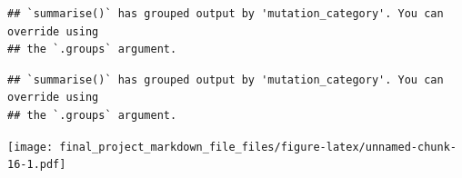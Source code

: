 \documentclass[
]{article}
\newenvironment{Shaded}{\begin{snugshade}}{\end{snugshade}}
\newcommand{\CommentTok}[1]{\textcolor[rgb]{0.56,0.35,0.01}{\textit{#1}}}
\newcommand{\DataTypeTok}[1]{\textcolor[rgb]{0.13,0.29,0.53}{#1}}
\newcommand{\DecValTok}[1]{\textcolor[rgb]{0.00,0.00,0.81}{#1}}
\newcommand{\FloatTok}[1]{\textcolor[rgb]{0.00,0.00,0.81}{#1}}
\newcommand{\KeywordTok}[1]{\textcolor[rgb]{0.13,0.29,0.53}{\textbf{#1}}}
\newcommand{\NormalTok}[1]{#1}
\newcommand{\OperatorTok}[1]{\textcolor[rgb]{0.81,0.36,0.00}{\textbf{#1}}}
\newcommand{\StringTok}[1]{\textcolor[rgb]{0.31,0.60,0.02}{#1}}
\begin{document}
\begin{verbatim}
## `summarise()` has grouped output by 'mutation_category'. You can override using
## the `.groups` argument.
\end{verbatim}

\begin{Shaded}
\end{Shaded}

\begin{verbatim}
## `summarise()` has grouped output by 'mutation_category'. You can override using
## the `.groups` argument.
\end{verbatim}

\begin{Shaded}
\end{Shaded}

\texttt{[image: final\_project\_markdown\_file\_files/figure-latex/unnamed-chunk-16-1.pdf]}
\end{document}
